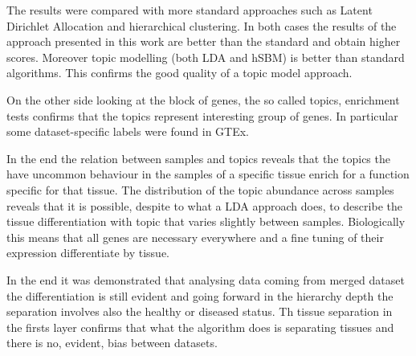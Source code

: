 The results were compared with more standard approaches such as Latent Dirichlet Allocation and hierarchical clustering. In both cases the results of the approach presented in this work are better than the standard and obtain higher scores. Moreover topic modelling (both LDA and hSBM) is better than standard algorithms. This confirms the good quality of a topic model approach.

On the other side looking at the block of genes, the so called topics, enrichment tests confirms that the topics represent interesting group of genes. In particular some dataset-specific labels were found in GTEx.

In the end the relation between samples and topics reveals that the topics the have uncommon behaviour in the samples of a specific tissue enrich for a function specific for that tissue. The distribution of the topic abundance across samples reveals that it is possible, despite to what a LDA approach does, to describe the tissue differentiation with topic that varies slightly between samples. Biologically this means that all genes are necessary everywhere and a fine tuning of their expression differentiate by tissue.

In the end it was demonstrated that analysing data coming from merged dataset the differentiation is still evident and going forward in the hierarchy depth the separation involves also the healthy or diseased status. Th tissue separation in the firsts layer confirms that what the algorithm does is separating tissues and there is no, evident, bias between datasets.